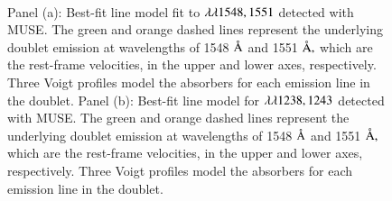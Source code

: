 \begin{figure}
        \\
\caption[ $\lam\lam1548,1551$ and  $\lam\lam1238,1243$ lines in MUSE and their best-fits]{Panel (a): Best-fit line model fit to  $\lam\lam1548,1551$ detected with MUSE. The green and orange dashed lines represent the underlying doublet emission at wavelengths of 1548 $\mbox{\normalfont\AA }$ and 1551 $\mbox{\normalfont\AA },$ which are the rest-frame velocities, in the $\text{upper}$ and $\text{lower}$ axes, respectively. Three Voigt profiles model the absorbers for each emission line in the doublet. Panel (b): Best-fit line model for  $\lam\lam1238,1243$ detected with MUSE. The green and orange dashed lines represent the underlying doublet emission at wavelengths of 1548 $\mbox{\normalfont\AA }$ and 1551 $\mbox{\normalfont\AA },$ which are the rest-frame velocities, in the $\text{upper}$ and $\text{lower}$ axes, respectively. Three Voigt profiles model the absorbers for each emission line in the doublet. }
\label{fig:CIV-and-NV-lines}
\end{figure}

